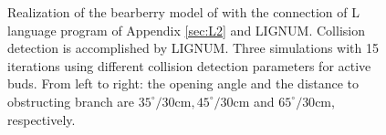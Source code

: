 \begin{figure}
\caption{Realization of the bearberry model of \citet{salemaa:02} with
the  connection of  L language  program of  Appendix  \ref{sec:L2} and
LIGNUM.   Collision  detection   is  accomplished  by  LIGNUM.   Three
simulations  with 15  iterations using  different  collision detection
parameters for active buds. From  left to right: the opening angle and
the  distance  to  obstructing branch  are  $35^{\circ}/30\mathrm{cm},
45^{\circ}/30\mathrm{cm}$        and       $65^{\circ}/30\mathrm{cm}$,
respectively.}\label{fig:a-uva-ursi} 
\end{figure}
